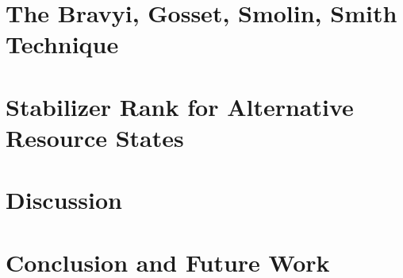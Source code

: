 \documentclass[11pt,a4paper,twoside]{report}
\theoremstyle{plain}%
\theoremstyle{definition}
\theoremstyle{remark}
\begin{document}
\chapter{The Bravyi, Gosset, Smolin, Smith Technique}\label{chap:bssg}

\chapter{Stabilizer Rank for Alternative Resource States}\label{chap:results}

\chapter{Discussion}\label{chap:discussion}

\chapter{Conclusion and Future Work}\label{chap:conclusion}



\end{document}
